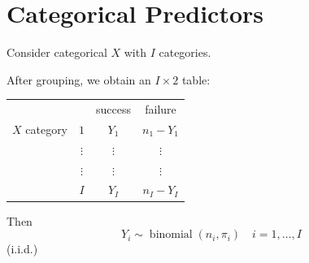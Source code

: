 \documentclass[11pt]{elegantbook}
\begin{document}
\section{Categorical Predictors}
Consider categorical $X$ with $I$ categories.

After grouping, we obtain an $I \times 2$ table:

\begin{tabular}{cc|c|c|}
    \multicolumn{2}{c}{ } & \multicolumn{1}{c}{ success } & \multicolumn{1}{c}{ failure } \\
    \cline { 3 - 4 }$X$ category & $1$ & $Y_1$ & $n_1-Y_1$ \\
& $\vdots$ & $\vdots$ & $\vdots$ \\
& $\vdots$ & $\vdots$ & $\vdots$ \\
& $I$ & $Y_I$ & $n_I-Y_I$ 
\end{tabular}

Then
$$
Y_i \sim \operatorname{binomial}\left(n_i, \pi_i\right) \quad i=1, \ldots, I
$$ (i.i.d.)
\end{document}
